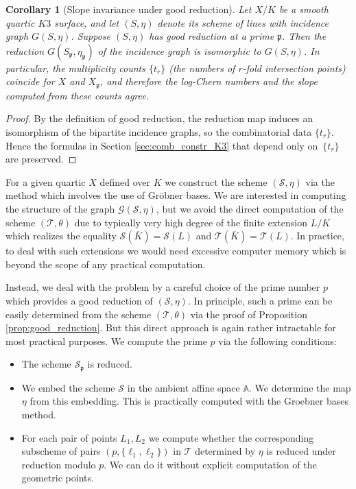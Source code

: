 \documentclass{article}
\theoremstyle{plain}
\newtheorem{corollary}[thm]{Corollary}
\theoremstyle{definition}
\numberwithin{equation}{section}
\begin{document}
\begin{corollary}[Slope invariance under good reduction]\label{cor:slope-invariance}
Let $X/K$ be a smooth quartic $K3$ surface, and let $(S,\eta)$ denote its scheme of lines with incidence graph $G(S,\eta)$. Suppose $(S,\eta)$ has good reduction at a prime $\mathfrak{p}$. Then the reduction
$G(S_{\mathfrak{p}},\eta_{\mathfrak{p}})$
of the incidence graph is isomorphic to $G(S,\eta)$. In particular, the multiplicity counts $\{t_r\}$ (the numbers of $r$-fold intersection points) coincide for $X$ and $X_{\mathfrak{p}}$, and therefore the log-Chern numbers and the slope computed from these counts agree.
\end{corollary}

\begin{proof}
By the definition of good reduction, the reduction map induces an isomorphism of the bipartite incidence graphs, so the combinatorial data $\{t_r\}$. Hence the formulas in Section \ref{sec:comb_constr_K3} that depend only on~$\{t_r\}$ are preserved.
\end{proof}



For a given quartic $X$ defined over $K$ we construct the scheme $(\mathcal{S},\eta)$ via the method which involves the use of Gr\"obner bases. We are interested in computing the structure of the graph $\mathcal{G}(\mathcal{S},\eta)$, but we avoid the direct computation of the scheme $(\mathcal{T},\theta)$ due to typically very high degree of the finite extension $L/K$ which realizes the equality $\mathcal{S}(\overline{K}) = \mathcal{S}(L)$ and $\mathcal{T}(\overline{K}) = \mathcal{T}(L)$. In practice, to deal with such extensions we would need excessive computer memory which is beyond the scope of any practical computation.

Instead, we deal with the problem by a careful choice of the prime number $p$ which provides a good reduction of $(\mathcal{S},\eta)$. In principle, such a prime can be easily determined from the scheme $(\mathcal{T},\theta)$ via the proof of Proposition \ref{prop:good_reduction}. But this direct approach is again rather intractable for most practical purposes. We compute the prime $p$ via the following conditions:
\begin{itemize}
	\item[(I)]The scheme $\mathcal{S}_{\mathfrak{p}}$ is reduced.
	\item[(II)]We embed the scheme $\mathcal{S}$ in the ambient affine space $\mathbb{A}$. We determine the map $\eta$ from this embedding. This is practically computed with the Groebner bases method.
	\item[(III)]For each pair of points $L_{1},L_{2}$ we compute whether the corresponding subscheme of pairs $(p,\{\ell_{1},\ell_{2}\})$ in $\mathcal{T}$ determined by $\eta$ is reduced under reduction modulo $p$. We can do it without explicit computation of the geometric points.
\end{itemize}
\end{document}
